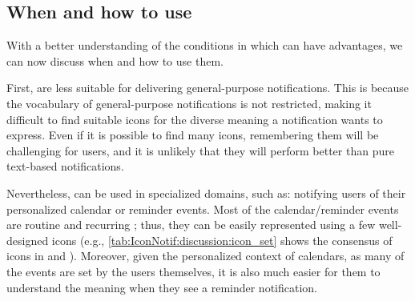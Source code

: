 \subsection{When and how to use }
\label{sec:IconNotif:general_discussion:when_icon_notif}

With a better understanding of the conditions in which  can have advantages, we can now discuss when and how to use them. 

First,  are less suitable for delivering general-purpose notifications. This is because the vocabulary of general-purpose notifications is not restricted, making it difficult to find suitable icons for the diverse meaning a notification wants to express. Even if it is possible to find many icons, remembering them will be challenging for users, and it is unlikely that they will perform better than pure text-based notifications.

Nevertheless,  can be used in specialized domains, such as: notifying users of their personalized calendar or reminder events. Most of the calendar/reminder  events are routine and recurring \cite{tungare_exploratory_2008, kelley_how_1982}; thus, they can be easily represented using a few well-designed icons (e.g.,  \autoref{tab:IconNotif:discussion:icon_set} shows the consensus of icons in \studythree{} and \studyfour{}). Moreover, given the personalized context of calendars, as many of the events are set by the users themselves, it is also much easier for them to understand the meaning when they see a reminder notification.

